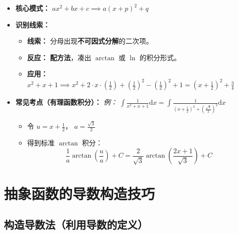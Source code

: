 \documentclass[lang=cn,math=mtpro2,11pt,scheme=chinese]{elegantbook}
\begin{document}
\begin{itemize}
    \item \textbf{核心模式：} $ax^2 + bx + c \implies a(x+p)^2 + q$
    
    \item \textbf{识别线索：}
    \begin{itemize}
        \item \textbf{线索：} 分母出现\textbf{不可因式分解}的二次项。
        \item \textbf{反应：} \textbf{配方法}，凑出 $\arctan$ 或 $\ln$ 的积分形式。
        \item \textbf{应用：} $x^2 + x + 1 \implies x^2 + 2 \cdot x \cdot (\frac{1}{2}) + (\frac{1}{2})^2 - (\frac{1}{2})^2 + 1 = (x + \frac{1}{2})^2 + \frac{3}{4}$
    \end{itemize}

    \item \textbf{常见考点（有理函数积分）：}
    \textit{例：} $\int \frac{1}{x^2+x+1} \mathrm{d}x = \int \frac{1}{(x + \frac{1}{2})^2 + (\frac{\sqrt{3}}{2})^2} \mathrm{d}x$
    \begin{itemize}
        \item 令 $u = x + \frac{1}{2}$， $a = \frac{\sqrt{3}}{2}$
        \item 得到标准 $\arctan$ 积分：
        $$ \frac{1}{a} \arctan\left(\frac{u}{a}\right) + C = \frac{2}{\sqrt{3}} \arctan\left(\frac{2x+1}{\sqrt{3}}\right) + C $$
    \end{itemize}
\end{itemize}

\section{抽象函数的导数构造技巧}

\subsection{构造导数法（利用导数的定义）}
\end{document}
